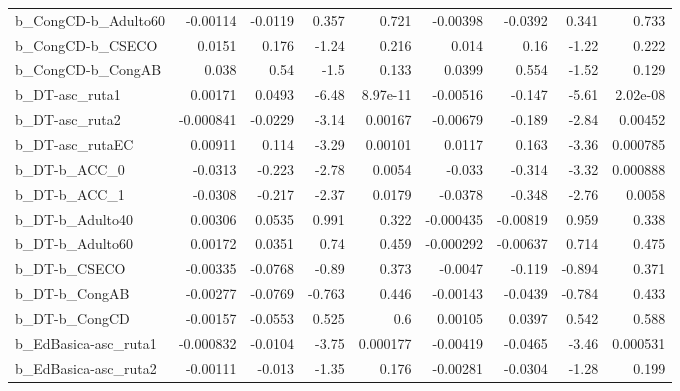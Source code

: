 \begin{tabular}{lrrrrrrrr}
b\_CongCD-b\_Adulto60        &    -0.00114 &      -0.0119 &     0.357 &    0.721 &   -0.00398 &     -0.0392 &        0.341 &         0.733 \\
b\_CongCD-b\_CSECO           &      0.0151 &        0.176 &     -1.24 &    0.216 &      0.014 &        0.16 &        -1.22 &         0.222 \\
b\_CongCD-b\_CongAB          &       0.038 &         0.54 &      -1.5 &    0.133 &     0.0399 &       0.554 &        -1.52 &         0.129 \\
b\_DT-asc\_ruta1             &     0.00171 &       0.0493 &     -6.48 & 8.97e-11 &   -0.00516 &      -0.147 &        -5.61 &      2.02e-08 \\
b\_DT-asc\_ruta2             &   -0.000841 &      -0.0229 &     -3.14 &  0.00167 &   -0.00679 &      -0.189 &        -2.84 &       0.00452 \\
b\_DT-asc\_rutaEC            &     0.00911 &        0.114 &     -3.29 &  0.00101 &     0.0117 &       0.163 &        -3.36 &      0.000785 \\
b\_DT-b\_ACC\_0               &     -0.0313 &       -0.223 &     -2.78 &   0.0054 &     -0.033 &      -0.314 &        -3.32 &      0.000888 \\
b\_DT-b\_ACC\_1               &     -0.0308 &       -0.217 &     -2.37 &   0.0179 &    -0.0378 &      -0.348 &        -2.76 &        0.0058 \\
b\_DT-b\_Adulto40            &     0.00306 &       0.0535 &     0.991 &    0.322 &  -0.000435 &    -0.00819 &        0.959 &         0.338 \\
b\_DT-b\_Adulto60            &     0.00172 &       0.0351 &      0.74 &    0.459 &  -0.000292 &    -0.00637 &        0.714 &         0.475 \\
b\_DT-b\_CSECO               &    -0.00335 &      -0.0768 &     -0.89 &    0.373 &    -0.0047 &      -0.119 &       -0.894 &         0.371 \\
b\_DT-b\_CongAB              &    -0.00277 &      -0.0769 &    -0.763 &    0.446 &   -0.00143 &     -0.0439 &       -0.784 &         0.433 \\
b\_DT-b\_CongCD              &    -0.00157 &      -0.0553 &     0.525 &      0.6 &    0.00105 &      0.0397 &        0.542 &         0.588 \\
b\_EdBasica-asc\_ruta1       &   -0.000832 &      -0.0104 &     -3.75 & 0.000177 &   -0.00419 &     -0.0465 &        -3.46 &      0.000531 \\
b\_EdBasica-asc\_ruta2       &    -0.00111 &       -0.013 &     -1.35 &    0.176 &   -0.00281 &     -0.0304 &        -1.28 &         0.199 \\

\end{tabular}
